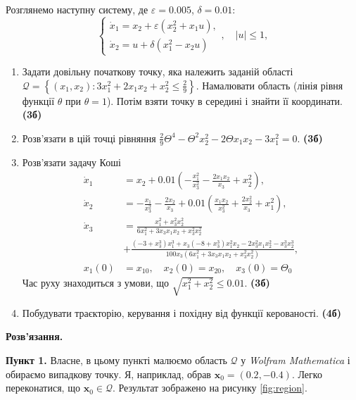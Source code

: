 \documentclass{hw_template}
\begin{document}
\begin{problem}
    Розглянемо наступну систему, де $\varepsilon=0.005$, $\delta=0.01$:
    \begin{equation*}
        \begin{cases}
            \dot{x}_1 = x_2 + \varepsilon(x_2^2+x_1u), \\
            \dot{x}_2 = u + \delta(x_1^2-x_2u)
        \end{cases}, \quad |u|\leq 1,
    \end{equation*}
    \begin{enumerate}
        \item Задати довільну початкову точку, яка належить заданій області
        $\mathcal{Q}=\left\{(x_1,x_2):3x_1^2+2x_1x_2+x_2^2\leq
        \frac{2}{9}\right\}$. Намалювати область (лінія рівня функції 
        $\theta$ при $\theta=1$). Потім взяти точку в середині і знайти 
        її координати. \textbf{(3б)}
        \item Розв'язати в цій точці рівняння $\frac{2}{9}\Theta^4 -
        \Theta^2x_2^2 - 2\Theta x_1x_2 - 3x_1^2 = 0$. \textbf{(3б)}
        \item Розв'язати задачу Коші 
        \begin{align*}
            \dot{x}_1 &= x_2 + 0.01\left(-\frac{x_1^2}{x_3^2}-\frac{2x_1x_2}{x_3}+x_2^2\right),\\
            \dot{x}_2 &= -\frac{x_1}{x_3^2}-\frac{2x_2}{x_3}+0.01\left(\frac{x_1x_2}{x_3^2}+\frac{2x_2^2}{x_3}+x_1^2\right),\\
            \dot{x}_3 &= \frac{x_1^2+x_3^2x_2^2}{6x_1^2+3x_3x_1x_2+x_3^2x_2^2} \\
            &+ \frac{(-3+x_3^3)x_1^3+x_3(-8+x_3^3)x_1^2x_2 - 2x_3^2x_1x_2^2-x_3^3x_2^3}{100x_3(6x_1^2+3x_3x_1x_2+x_3^2x_2^2)}, \\
            x_1(0) &= x_{10}, \quad x_2(0) = x_{20}, \quad x_3(0) = \Theta_0 
        \end{align*}
        Час руху знаходиться з умови, що $\sqrt{x_1^2+x_2^2}\leq 0.01$. \textbf{(3б)}
        \item Побудувати траєкторію, керування і похідну від функції керованості. \textbf{(4б)}
    \end{enumerate}
\end{problem}

\textbf{Розв'язання.}

\textbf{Пункт 1.} Власне, в цьому пункті малюємо область $\mathcal{Q}$ у
\textit{Wolfram Mathematica} і обираємо випадкову точку. Я, наприклад, обрав
$\mathbf{x}_0 = \left(0.2, -0.4\right)$. Легко переконатися, що $\mathbf{x}_0
\in \mathcal{Q}$. Результат зображено на рисунку \ref{fig:region}.
\end{document}
